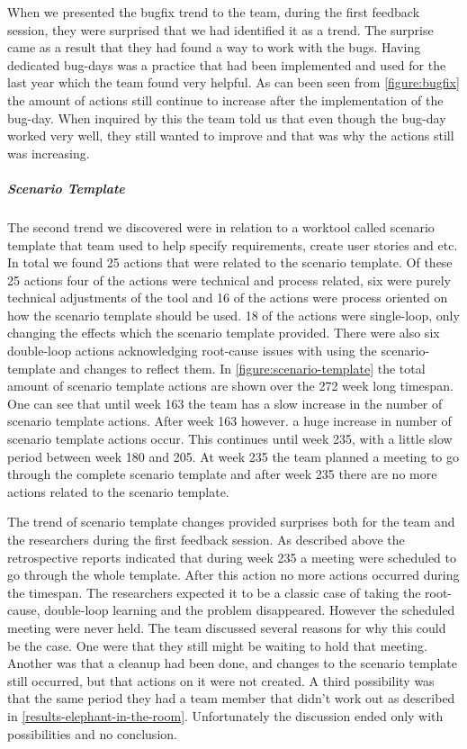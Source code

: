 When we presented the bugfix trend to the team, during the first feedback session, they were surprised that we had identified it as a trend. The surprise came as a result that they had found a way to work with the bugs. Having dedicated bug-days was a practice that had been implemented and used for the last year which the team found very helpful. As can been seen from \autoref{figure:bugfix} the amount of actions still continue to increase after the implementation of the bug-day. When inquired by this the team told us that even though the bug-day worked very well, they still wanted to improve and that was why the actions still was increasing. 

\subparagraph{Scenario Template}\label{results-ca-scenario-template}
The second trend we discovered were in relation to a worktool called scenario template that team used to help specify requirements, create user stories and etc. In total we found 25 actions that were related to the scenario template. Of these 25 actions four of the actions were technical and process related, six were purely technical adjustments of the tool and 16 of the actions were process oriented on how the scenario template should be used. 18 of the actions were single-loop, only changing the effects which the scenario template provided. There were also six double-loop actions acknowledging root-cause issues with using the scenario-template and changes to reflect them. 
In \autoref{figure:scenario-template} the total amount of scenario template actions are shown over the 272 week long timespan. One can see that until week 163 the team has a slow increase in the number of scenario template actions. After week 163 however. a huge increase in number of scenario template actions occur. This continues until week 235, with a little slow period between week 180 and 205. At week 235 the team planned a meeting to go through the complete scenario template and after week 235 there are no more actions related to the scenario template. 

The trend of scenario template changes provided surprises both for the team and the researchers during the first feedback session. As described above the retrospective reports indicated that during week 235 a meeting were scheduled to go through the whole template. After this action no more actions occurred during the timespan. The researchers expected it to be a classic case of taking the root-cause, double-loop learning and the problem disappeared. However the scheduled meeting were never held. The team discussed several reasons for why this could be the case. One were that they still might be waiting to hold that meeting. Another was that a cleanup had been done, and changes to the scenario template still occurred, but that actions on it were not created. A third possibility was that the same period they had a team member that didn't work out as described in \autoref{results-elephant-in-the-room}. Unfortunately the discussion ended only with possibilities and no conclusion. 

